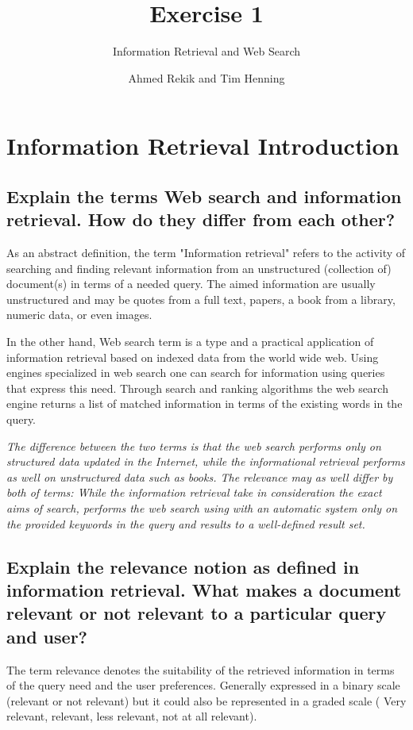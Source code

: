 \documentclass{scrartcl}
\title{Exercise 1}
\subtitle{Information Retrieval and Web Search}
\author{Ahmed Rekik and Tim Henning}
\begin{document}
\maketitle

\setcounter{section}{1}
\section{Information Retrieval Introduction}

\subsection{Explain the terms Web search and information retrieval. How do they differ from each
	other?}

As an abstract definition, the term "Information retrieval" refers to the activity of searching and finding relevant information from an unstructured (collection of) document(s) in terms of a needed query. The aimed information are usually unstructured and may be quotes from a full text, papers, a book from a library, numeric data, or even images.

In the other hand, Web search term is a type and a practical application of information retrieval based on indexed data from the world wide web. Using engines specialized in web search one can search for information using queries that express this need. Through search and ranking algorithms the web search engine returns a list of matched information in terms of the existing words in the query.

\textit{The difference between the two terms is that the web search performs only on structured data updated in the Internet, while the informational retrieval performs as well on unstructured data such as books. The relevance may as well differ by both of terms: While the information retrieval take in consideration the exact aims of search, performs the web search using with an automatic system only on the provided keywords in the query and results to a well-defined result set.}

\subsection{Explain the relevance notion as defined in information retrieval. What makes a document
	relevant or not relevant to a particular query and user?}

The term relevance denotes the suitability of the retrieved information in terms of the query need and the user preferences. Generally expressed in a binary scale (relevant or not relevant) but it could also be represented in a graded scale ( Very relevant, relevant, less relevant, not at all relevant).
\end{document}
